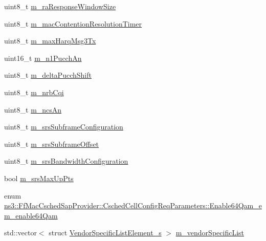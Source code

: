 \begin{DoxyCompactItemize}
\item 
uint8\+\_\+t \hyperlink{structns3_1_1FfMacCschedSapProvider_1_1CschedCellConfigReqParameters_a95a40cbdaf3e1dd6e5a84dc1b5628ec1}{m\+\_\+ra\+Response\+Window\+Size}
\item 
uint8\+\_\+t \hyperlink{structns3_1_1FfMacCschedSapProvider_1_1CschedCellConfigReqParameters_ae2258fb9c9e5d87a6508a3a7dc8ce507}{m\+\_\+mac\+Contention\+Resolution\+Timer}
\item 
uint8\+\_\+t \hyperlink{structns3_1_1FfMacCschedSapProvider_1_1CschedCellConfigReqParameters_a57410ad029227978d0685fad30efa156}{m\+\_\+max\+Harq\+Msg3\+Tx}
\item 
uint16\+\_\+t \hyperlink{structns3_1_1FfMacCschedSapProvider_1_1CschedCellConfigReqParameters_a577ef031998d57220d6f60cc6138980e}{m\+\_\+n1\+Pucch\+An}
\item 
uint8\+\_\+t \hyperlink{structns3_1_1FfMacCschedSapProvider_1_1CschedCellConfigReqParameters_a58d4c25bd0c5ac20e8de12e529995364}{m\+\_\+delta\+Pucch\+Shift}
\item 
uint8\+\_\+t \hyperlink{structns3_1_1FfMacCschedSapProvider_1_1CschedCellConfigReqParameters_a051308037433715ebee8258c43c0e6ed}{m\+\_\+nrb\+Cqi}
\item 
uint8\+\_\+t \hyperlink{structns3_1_1FfMacCschedSapProvider_1_1CschedCellConfigReqParameters_ae70861bfdd2148b0b097b5193449fb79}{m\+\_\+ncs\+An}
\item 
uint8\+\_\+t \hyperlink{structns3_1_1FfMacCschedSapProvider_1_1CschedCellConfigReqParameters_a4abe6dde6f7ce2e2ea58a7512b7cca39}{m\+\_\+srs\+Subframe\+Configuration}
\item 
uint8\+\_\+t \hyperlink{structns3_1_1FfMacCschedSapProvider_1_1CschedCellConfigReqParameters_abb258a6ea60f2e31600c33711c8f6fc4}{m\+\_\+srs\+Subframe\+Offset}
\item 
uint8\+\_\+t \hyperlink{structns3_1_1FfMacCschedSapProvider_1_1CschedCellConfigReqParameters_a87a6989273cb714ea164a119ec1279a7}{m\+\_\+srs\+Bandwidth\+Configuration}
\item 
bool \hyperlink{structns3_1_1FfMacCschedSapProvider_1_1CschedCellConfigReqParameters_a900a9ca5af5a2a350f3440933a154150}{m\+\_\+srs\+Max\+Up\+Pts}
\item 
enum \hyperlink{structns3_1_1FfMacCschedSapProvider_1_1CschedCellConfigReqParameters_ad74d30a80e867406e829e1f1e0794b1e}{ns3\+::\+Ff\+Mac\+Csched\+Sap\+Provider\+::\+Csched\+Cell\+Config\+Req\+Parameters\+::\+Enable64\+Qam\+\_\+e} \hyperlink{structns3_1_1FfMacCschedSapProvider_1_1CschedCellConfigReqParameters_a387be11d305f6749d88cc6d740baa0b0}{m\+\_\+enable64\+Qam}
\item 
std\+::vector$<$ struct \hyperlink{structns3_1_1VendorSpecificListElement__s}{Vendor\+Specific\+List\+Element\+\_\+s} $>$ \hyperlink{structns3_1_1FfMacCschedSapProvider_1_1CschedCellConfigReqParameters_a7b116db831ef64dd3779ba441c3521ae}{m\+\_\+vendor\+Specific\+List}
\end{DoxyCompactItemize}


